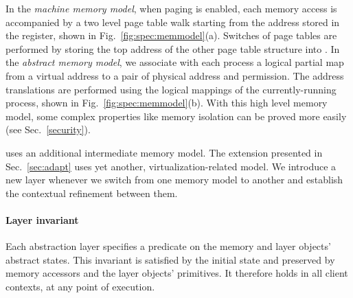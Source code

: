 {In the \emph{machine memory model}, when paging is enabled, each memory
access is accompanied by a two level page table walk starting from the
address stored in the  register, shown in Fig.~\ref{fig:spec:memmodel}(a). Switches of page tables are
performed by storing the top address of the other page table structure
into .
In the \emph{abstract memory model}, we associate with each process a logical
partial map from a virtual address to a pair of physical address and
permission. The address translations are performed using the logical
mappings of the currently-running process, shown in Fig.~\ref{fig:spec:memmodel}(b).
With this high level memory model, some complex properties like
memory isolation can be proved more easily
(see Sec.~\ref{security}).

\mCTOSbase{} uses an additional intermediate memory model.
The \mCTOShyper{} extension presented in Sec.~\ref{sec:adapt}
uses yet another, virtualization-related model.
We introduce a new layer whenever we switch
from one memory model to another
and establish the contextual refinement between them.

\paragraph{Layer invariant}
Each abstraction layer specifies a predicate
on the memory and layer objects' abstract states.
This invariant is satisfied by the initial state and
preserved by memory accessors and the layer objects' primitives.
It therefore holds in all client contexts,
at any point of execution.

}

